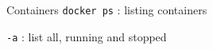 \documentclass[10pt]{article}
\newcommand{\code}[1]{{\color{teal}\texttt{#1}}}
\begin{document}
\begin{multicols*}{2}

  \begin{mybox}{Containers}
    \code{docker ps} : listing containers \\[.3em]
    \hspace*{.5cm}\begin{minipage}{0.8\textwidth}
      \code{-a} : list all, running and stopped
    \end{minipage}\\[.5em]
  \end{mybox}

\end{multicols*}
\end{document}
